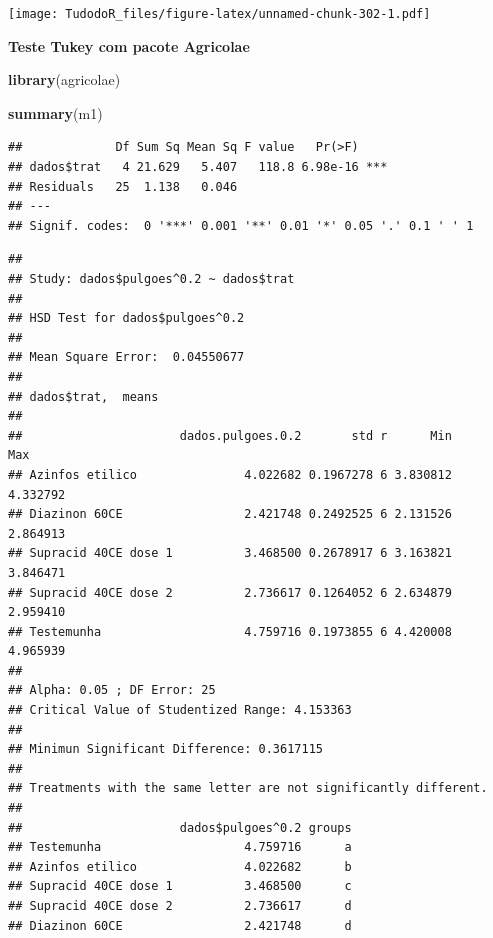 \documentclass[
]{book}
\newenvironment{Shaded}{\begin{snugshade}}{\end{snugshade}}
\newcommand{\CommentTok}[1]{\textcolor[rgb]{0.56,0.35,0.01}{\textit{#1}}}
\newcommand{\DataTypeTok}[1]{\textcolor[rgb]{0.13,0.29,0.53}{#1}}
\newcommand{\FloatTok}[1]{\textcolor[rgb]{0.00,0.00,0.81}{#1}}
\newcommand{\KeywordTok}[1]{\textcolor[rgb]{0.13,0.29,0.53}{\textbf{#1}}}
\newcommand{\NormalTok}[1]{#1}
\newcommand{\OperatorTok}[1]{\textcolor[rgb]{0.81,0.36,0.00}{\textbf{#1}}}
\newcommand{\StringTok}[1]{\textcolor[rgb]{0.31,0.60,0.02}{#1}}
\begin{document}
\texttt{[image: TudodoR\_files/figure-latex/unnamed-chunk-302-1.pdf]}

\textbf{Teste Tukey com pacote Agricolae}

\begin{Shaded}
\begin{Highlighting}[]
\KeywordTok{library}\NormalTok{(agricolae)}
\end{Highlighting}
\end{Shaded}

\begin{Shaded}
\begin{Highlighting}[]
\KeywordTok{summary}\NormalTok{(m1)}
\end{Highlighting}
\end{Shaded}

\begin{verbatim}
##             Df Sum Sq Mean Sq F value   Pr(>F)    
## dados$trat   4 21.629   5.407   118.8 6.98e-16 ***
## Residuals   25  1.138   0.046                     
## ---
## Signif. codes:  0 '***' 0.001 '**' 0.01 '*' 0.05 '.' 0.1 ' ' 1
\end{verbatim}

\begin{Shaded}
\end{Shaded}

\begin{verbatim}
## 
## Study: dados$pulgoes^0.2 ~ dados$trat
## 
## HSD Test for dados$pulgoes^0.2 
## 
## Mean Square Error:  0.04550677 
## 
## dados$trat,  means
## 
##                      dados.pulgoes.0.2       std r      Min      Max
## Azinfos etilico               4.022682 0.1967278 6 3.830812 4.332792
## Diazinon 60CE                 2.421748 0.2492525 6 2.131526 2.864913
## Supracid 40CE dose 1          3.468500 0.2678917 6 3.163821 3.846471
## Supracid 40CE dose 2          2.736617 0.1264052 6 2.634879 2.959410
## Testemunha                    4.759716 0.1973855 6 4.420008 4.965939
## 
## Alpha: 0.05 ; DF Error: 25 
## Critical Value of Studentized Range: 4.153363 
## 
## Minimun Significant Difference: 0.3617115 
## 
## Treatments with the same letter are not significantly different.
## 
##                      dados$pulgoes^0.2 groups
## Testemunha                    4.759716      a
## Azinfos etilico               4.022682      b
## Supracid 40CE dose 1          3.468500      c
## Supracid 40CE dose 2          2.736617      d
## Diazinon 60CE                 2.421748      d
\end{verbatim}
\end{document}

